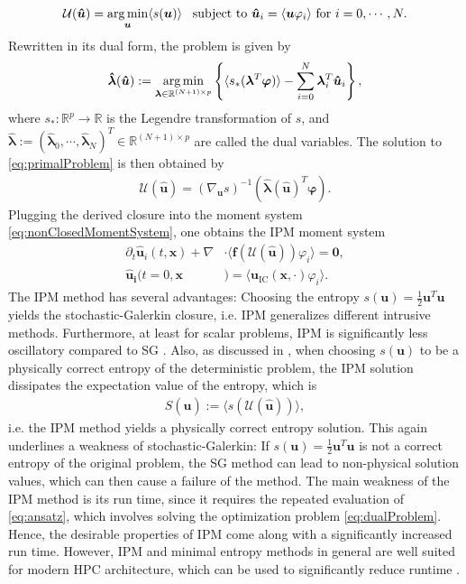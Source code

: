 \begin{align}\label{eq:primalProblem}
\mathcal{U}(\bm{\hat u}) = \operatorname*{arg\,min}_{\bm u} \langle s(\bm u) \rangle \enskip \text{ subject to } \bm{\hat u}_i = \langle \bm u \varphi_i \rangle \text{ for } i = 0,\cdots,N.
\end{align}
Rewritten in its dual form, the problem is given by
\begin{align}\label{eq:dualProblem}
 \bm{\hat \lambda}(\bm{\hat u}) := \operatorname*{arg\,min}_{\bm{\lambda} \in \mathbb{R}^{(N+1) \times p}}
  \left\{\langle s_*(\bm{\lambda}^T \bm\varphi)\rangle - \sum_{i=0}^{N}\bm{\lambda}_i^T \bm{\hat u}_i\right\},
\end{align}
where $s_*:\mathbb{R}^p\to\mathbb{R}$ is the Legendre transformation of $s$, and $\bm{ \hat\lambda}:=(\bm{\hat{\lambda}}_0,\cdots,\bm{\hat{\lambda}}_N)^T\in \mathbb{R}^{(N+1) \times p}$ are called the dual variables. The solution to \eqref{eq:primalProblem} is then obtained by
\begin{align}\label{eq:ansatz}
 \mathcal{U}(\bm{\hat u}) = \left( \nabla_{\bm{u}} s \right)^{-1}(\bm{\hat{\lambda}}(\bm{\hat u})^T \bm{\varphi}).
\end{align}
Plugging the derived closure into the moment system \eqref{eq:nonClosedMomentSystem}, one obtains the IPM moment system
\begin{subequations}\label{eq:IPMmomentSystem}
\begin{align}
\partial_t \bm{\hat u}_i(t,\bm{x}) + \nabla&\cdot\langle\bm{f}(\mathcal{U}(\bm{\hat u})) \varphi_i\rangle = \bm{0}, \\
\bm{\hat u_i}(t=0,\bm{x}&) = \langle\bm{u}_{\text{IC}}(\bm{x},\cdot)\varphi_i\rangle.
\end{align}
\end{subequations}
The IPM method has several advantages: Choosing the entropy $s(\bm{u}) = \frac{1}{2}\bm{u}^T\bm{u}$ yields the stochastic-Galerkin closure, i.e. IPM generalizes different intrusive methods. Furthermore, at least for scalar problems, IPM is significantly less oscillatory compared to SG \cite{kusch2017maximum}. Also, as discussed in \cite{poette2009uncertainty}, when choosing $s(\bm u)$ to be a physically correct entropy of the deterministic problem, the IPM solution dissipates the expectation value of the entropy, which is
\begin{align*}
S(\bm{\hat u}) := \langle s( \mathcal{U}(\bm{\hat u}))\rangle,
\end{align*}
i.e. the IPM method yields a physically correct entropy solution. This again underlines a weakness of stochastic-Galerkin: If $s(\bm{u}) = \frac{1}{2}\bm{u}^T\bm{u}$ is not a correct entropy of the original problem, the SG method can lead to non-physical solution values, which can then cause a failure of the method. The main weakness of the IPM method is its run time, since it requires the repeated evaluation of \eqref{eq:ansatz}, which involves solving the optimization problem \eqref{eq:dualProblem}. Hence, the desirable properties of IPM come along with a significantly increased run time. However, IPM and minimal entropy methods in general are well suited for modern HPC architecture, which can be used to significantly reduce runtime \cite{garrett2015optimization}. 

